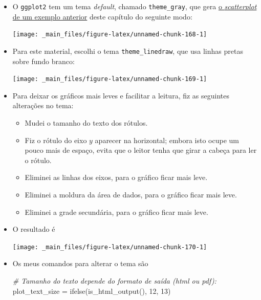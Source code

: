 \documentclass[
  11pt]{report}
\newenvironment{Shaded}{\begin{snugshade}}{\end{snugshade}}
\newcommand{\CommentTok}[1]{\textcolor[rgb]{0.56,0.35,0.01}{\textit{#1}}}
\newcommand{\DecValTok}[1]{\textcolor[rgb]{0.00,0.00,0.81}{#1}}
\newcommand{\FunctionTok}[1]{\textcolor[rgb]{0.00,0.00,0.00}{#1}}
\newcommand{\NormalTok}[1]{#1}
\newcommand{\OtherTok}[1]{\textcolor[rgb]{0.56,0.35,0.01}{#1}}
\renewenvironment{Shaded}{
    \begin{mdframed}[%
      roundcorner=2pt,%
      innerleftmargin=5pt,%
      innerrightmargin=5pt,%
      topline=true,%
      leftline=true,%
      rightline=true,%
      bottomline=true,%
      linewidth=0.5pt,%
      linecolor=black!20,%
      backgroundcolor=black!2,%
      skipabove=2ex,%
      skipbelow=2.5ex%
    ]%
  }
  {
    \end{mdframed}
  }
\begin{document}
\begin{itemize}
\item
  O \texttt{ggplot2} tem um tema \emph{default}, chamado \texttt{theme\_gray}, que gera \protect\hyperlink{grafico4}{o \emph{scatterplot} de um exemplo anterior} deste capítulo do seguinte modo:

  \begin{center}\texttt{[image: \_main\_files/figure-latex/unnamed-chunk-168-1]} \end{center}
\item
  Para este material, escolhi o tema \texttt{theme\_linedraw}, que usa linhas pretas sobre fundo branco:

  \begin{center}\texttt{[image: \_main\_files/figure-latex/unnamed-chunk-169-1]} \end{center}
\item
  Para deixar os gráficos mais leves e facilitar a leitura, fiz as seguintes alterações no tema:

  \begin{itemize}
  \item
    Mudei o tamanho do texto dos rótulos.
  \item
    Fiz o rótulo do eixo $y$ aparecer na horizontal; embora isto ocupe um pouco mais de espaço, evita que o leitor tenha que girar a cabeça para ler o rótulo.
  \item
    Eliminei as linhas dos eixos, para o gráfico ficar mais leve.
  \item
    Eliminei a moldura da área de dados, para o gráfico ficar mais leve.
  \item
    Eliminei a grade secundária, para o gráfico ficar mais leve.
  \end{itemize}
\item
  O resultado é

  \begin{center}\texttt{[image: \_main\_files/figure-latex/unnamed-chunk-170-1]} \end{center}
\item
  Os meus comandos para alterar o tema são

\begin{Shaded}
\begin{Highlighting}[]
\CommentTok{\# Tamanho do texto depende do formato de saída (html ou pdf):}
\NormalTok{plot\_text\_size }\OtherTok{=} \FunctionTok{ifelse}\NormalTok{(}\FunctionTok{is\_html\_output}\NormalTok{(), }\DecValTok{12}\NormalTok{, }\DecValTok{13}\NormalTok{)}


\end{Highlighting}
\end{Shaded}
\end{itemize}
\end{document}
